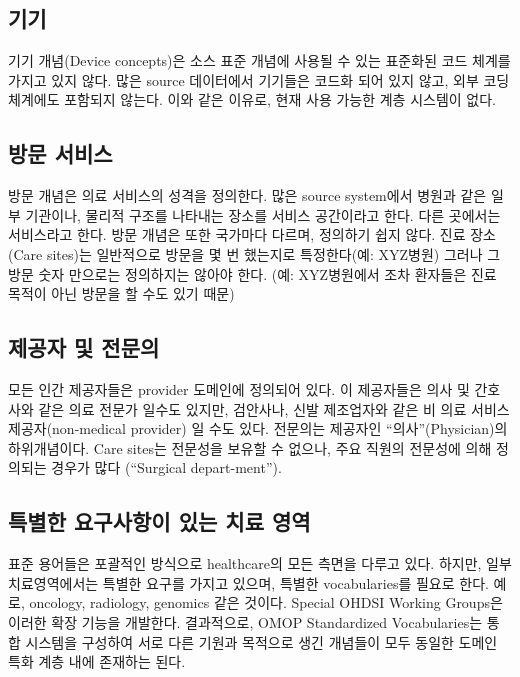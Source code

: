 \documentclass[11pt]{book}
\theoremstyle{definition}
\theoremstyle{definition}
\theoremstyle{definition}
\theoremstyle{remark}
\begin{document}
\subsection{기기}

기기 개념(Device concepts)은 소스 표준 개념에 사용될 수 있는 표준화된
코드 체계를 가지고 있지 않다. 많은 source 데이터에서 기기들은 코드화
되어 있지 않고, 외부 코딩 체계에도 포함되지 않는다. 이와 같은 이유로,
현재 사용 가능한 계층 시스템이 없다.

\subsection{방문 서비스}\label{-}

방문 개념은 의료 서비스의 성격을 정의한다. 많은 source system에서 병원과
같은 일부 기관이나, 물리적 구조를 나타내는 장소를 서비스 공간이라고
한다. 다른 곳에서는 서비스라고 한다. 방문 개념은 또한 국가마다 다르며,
정의하기 쉽지 않다. 진료 장소(Care sites)는 일반적으로 방문을 몇 번
했는지로 특정한다(예: XYZ병원) 그러나 그 방문 숫자 만으로는 정의하지는
않아야 한다. (예: XYZ병원에서 조차 환자들은 진료 목적이 아닌 방문을 할
수도 있기 때문)

\subsection{제공자 및 전문의}\label{--}

모든 인간 제공자들은 provider 도메인에 정의되어 있다. 이 제공자들은 의사
및 간호사와 같은 의료 전문가 일수도 있지만, 검안사나, 신발 제조업자와
같은 비 의료 서비스 제공자(non-medical provider) 일 수도 있다. 전문의는
제공자인 ``의사''(Physician)의 하위개념이다. Care sites는 전문성을
보유할 수 없으나, 주요 직원의 전문성에 의해 정의되는 경우가 많다
(``Surgical depart-ment'').

\subsection{특별한 요구사항이 있는 치료 영역}\label{----}

표준 용어들은 포괄적인 방식으로 healthcare의 모든 측면을 다루고 있다.
하지만, 일부 치료영역에서는 특별한 요구를 가지고 있으며, 특별한
vocabularies를 필요로 한다. 예로, oncology, radiology, genomics 같은
것이다. Special OHDSI Working Groups은 이러한 확장 기능을 개발한다.
결과적으로, OMOP Standardized Vocabularies는 통합 시스템을 구성하여 서로
다른 기원과 목적으로 생긴 개념들이 모두 동일한 도메인 특화 계층 내에
존재하는 된다.
\end{document}
